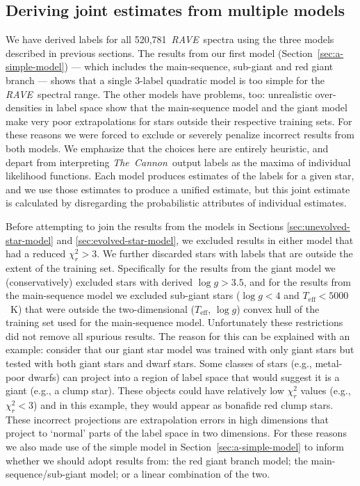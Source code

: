 \documentclass[preprint]{aastex}
\newcommand{\acronym}[1]{{\small{#1}}}
\newcommand{\project}[1]{\textsl{#1}}
\newcommand{\thecannon}{\project{The~Cannon}}
\newcommand{\rave}{\project{\acronym{RAVE}}}
\newcommand{\teff}{T_{\mathrm{eff}}}
\newcommand{\logg}{\log g}
\newcommand{\Nspectra}{520,781}
\begin{document}
\subsection{Deriving joint estimates from multiple models}
\label{sec:joining-the-models}


We have derived labels for all \Nspectra\ \rave\ spectra using the three models
described in previous sections.  The results from our first model 
(Section~\ref{sec:a-simple-model}) --- which includes the main-sequence, sub-giant 
and red giant branch --- shows that a single 3-label quadratic model is too simple 
for the \rave\ spectral range.   The other models have problems, too: unrealistic 
over-densities in label space show that the main-sequence model and the giant model
make very poor extrapolations for stars outside their respective training sets.  
For these reasons we were forced to exclude or severely penalize incorrect results
from both models.  We emphasize that the choices here are entirely heuristic, 
and depart from interpreting \thecannon\ output labels as the maxima of individual 
likelihood functions.  Each model produces estimates of the labels for a given star, 
and we use those estimates to produce a unified estimate, but this joint estimate 
is calculated by disregarding the probabilistic attributes of individual estimates.


Before attempting to join the results from the models in Sections 
\ref{sec:unevolved-star-model} and \ref{sec:evolved-star-model}, we excluded results
in either model that had a reduced $\chi_{r}^2 > 3$.  We further discarded stars with
labels that are outside the extent of the training set.  Specifically for the
results from the giant model we (conservatively) excluded stars with derived 
$\logg > 3.5$, and for the results from the main-sequence model we excluded 
sub-giant stars ($\logg < 4$ and $\teff < 5000$~K) that were outside the two-dimensional 
($\teff$, $\logg$) convex hull of the training set used for the main-sequence model.  
Unfortunately these restrictions did not remove all spurious results.  The reason 
for this can be explained with an example:  consider that our giant star model was 
trained with only giant stars but tested with both giant stars and dwarf stars.  
Some classes of stars (e.g., metal-poor dwarfs) can project into a region of label 
space that would suggest it is a giant (e.g., a clump star).  These objects could 
have relatively low $\chi_{r}^2$ values (e.g., $\chi_{r}^2 < 3$) and in this example,
they would appear as bonafide red clump stars.  These incorrect projections are 
extrapolation errors in high dimensions that project to `normal' parts of the label 
space in two dimensions.  For these reasons we also made use of the simple model in 
Section~\ref{sec:a-simple-model} to inform whether we should adopt results from: 
the red giant branch model; the main-sequence/sub-giant model; or a linear combination 
of the two. 
\end{document}
